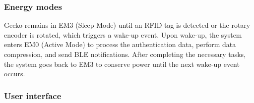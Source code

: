 \documentclass[a4paper,11pt]{article}%
\begin{document}


\subsubsection{Energy modes}


Gecko remains in EM3 (Sleep Mode) until an RFID tag is detected or the rotary encoder is rotated, which triggers a wake-up event. Upon wake-up, the system enters EM0 (Active Mode) to process the authentication data, perform data compression, and send BLE notifications. After completing the necessary tasks, the system goes back to EM3 to conserve power until the next wake-up event occurs.


\subsubsection{User interface}
\end{document}
